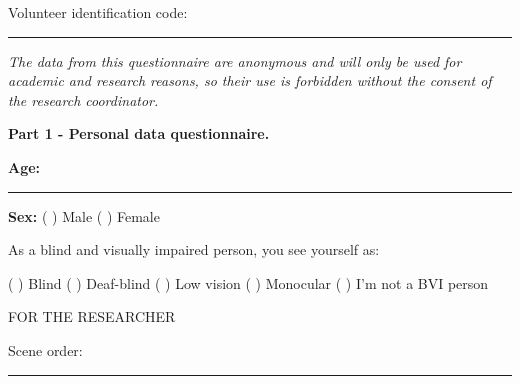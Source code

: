 {\color{gray}

Volunteer identification code: \rule{1in}{.2mm}

\textit{The data from this questionnaire are anonymous and will only be used for academic and research reasons, so their use is forbidden without the consent of the research coordinator.}
}


\begin{center}
\textbf{Part 1 - Personal data questionnaire.}
\end{center}


\textbf{Age:} \rule{1in}{.2mm} \hfill \textbf{Sex:}   ( ) Male \hfill ( ) Female

\vspace{2cm}

As a blind and visually impaired person, you see yourself as:

\noindent
( ) Blind \hfill \break
( ) Deaf-blind \hfill \break
( ) Low vision \hfill \break
( ) Monocular \hfill \break
( ) I'm not a BVI person \hfill \break

FOR THE RESEARCHER

\vspace{1cm}

Scene order:

\vspace{1cm}

\rule{10cm}{0.1mm}

\pagebreak